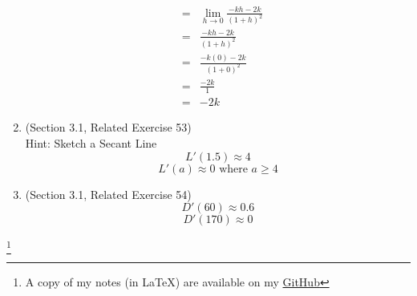 \documentclass{article}
\newcommand\blfootnote[1]{
    \begingroup
    \renewcommand\thefootnote{}\footnote{#1}
    \addtocounter{footnote}{-1}
    \endgroup
}
\begin{document}
\begin{enumerate}
\begin{eqnarray}
                                                &=& \lim_{h \to 0}{\frac{- kh - 2k}{(1 + h)^2}} \\
                                                &=& \frac{- kh - 2k}{(1 + h)^2} \\
                                                &=& \frac{- k(0) - 2k}{(1 + 0)^2} \\
                                                &=& \frac{- 2k}{1} \\
                                                &=& - 2k
    \end{eqnarray}
    \item (Section 3.1, Related Exercise 53)
        \\ Hint: Sketch a Secant Line
        $$L'(1.5) \approx 4$$
        $$L'(a) \approx 0 \text{ where } a \geq 4$$
    \item (Section 3.1, Related Exercise 54)
        $$D'(60) \approx 0.6$$
        $$D'(170) \approx 0$$
\end{enumerate}

\blfootnote{A copy of my notes (in \LaTeX) are available on my \href{https://github.com/onlinechronically/MATH-211}{GitHub}}
\end{document}
